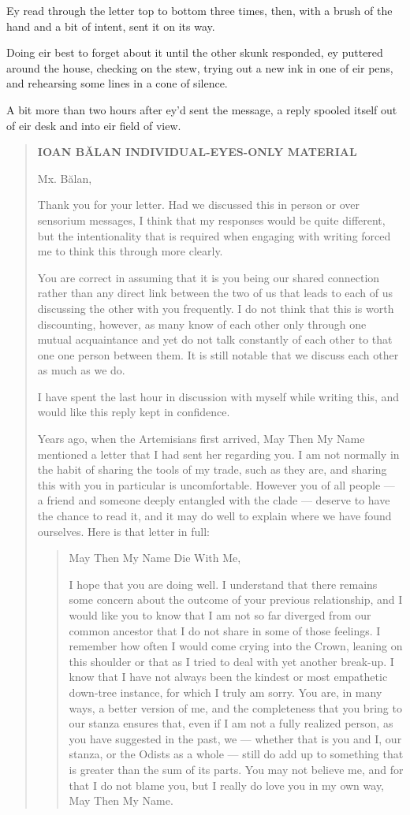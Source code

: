 Ey read through the letter top to bottom three times, then, with a brush of the hand and a bit of intent, sent it on its way.

Doing eir best to forget about it until the other skunk responded, ey puttered around the house, checking on the stew, trying out a new ink in one of eir pens, and rehearsing some lines in a cone of silence.

A bit more than two hours after ey'd sent the message, a reply spooled itself out of eir desk and into eir field of view.

\begin{quote}
\textbf{IOAN BĂLAN INDIVIDUAL-EYES-ONLY MATERIAL}

Mx. Bălan,

Thank you for your letter. Had we discussed this in person or over sensorium messages, I think that my responses would be quite different, but the intentionality that is required when engaging with writing forced me to think this through more clearly.

You are correct in assuming that it is you being our shared connection rather than any direct link between the two of us that leads to each of us discussing the other with you frequently. I do not think that this is worth discounting, however, as many know of each other only through one mutual acquaintance and yet do not talk constantly of each other to that one one person between them. It is still notable that we discuss each other as much as we do.

I have spent the last hour in discussion with myself while writing this, and would like this reply kept in confidence.

Years ago, when the Artemisians first arrived, May Then My Name mentioned a letter that I had sent her regarding you. I am not normally in the habit of sharing the tools of my trade, such as they are, and sharing this with you in particular is uncomfortable. However you of all people — a friend and someone deeply entangled with the clade — deserve to have the chance to read it, and it may do well to explain where we have found ourselves. Here is that letter in full:

\begin{quote}
May Then My Name Die With Me,

I hope that you are doing well. I understand that there remains some concern about the outcome of your previous relationship, and I would like you to know that I am not so far diverged from our common ancestor that I do not share in some of those feelings. I remember how often I would come crying into the Crown, leaning on this shoulder or that as I tried to deal with yet another break-up. I know that I have not always been the kindest or most empathetic down-tree instance, for which I truly am sorry. You are, in many ways, a better version of me, and the completeness that you bring to our stanza ensures that, even if I am not a fully realized person, as you have suggested in the past, we — whether that is you and I, our stanza, or the Odists as a whole — still do add up to something that is greater than the sum of its parts. You may not believe me, and for that I do not blame you, but I really do love you in my own way, May Then My Name.


\end{quote}
\end{quote}
